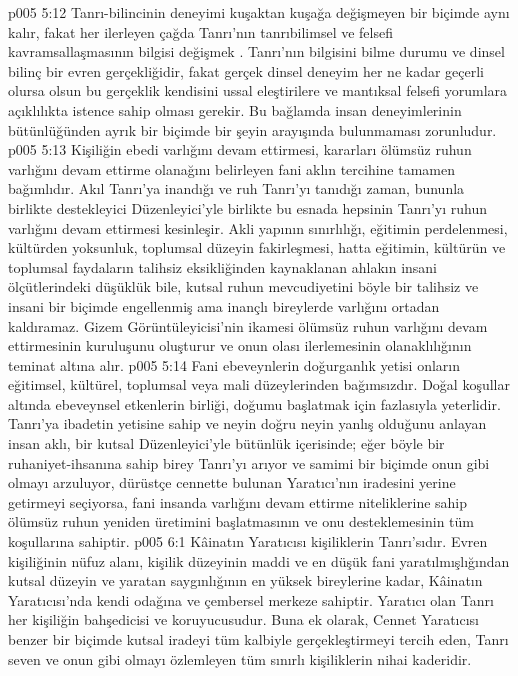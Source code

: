 \vs p005 5:12 Tanrı\hyp{}bilincinin deneyimi kuşaktan kuşağa değişmeyen bir biçimde aynı kalır, fakat her ilerleyen çağda Tanrı’nın tanrıbilimsel ve felsefi kavramsallaşmasının bilgisi değişmek . Tanrı’nın bilgisini bilme durumu ve dinsel bilinç bir evren gerçekliğidir, fakat gerçek dinsel deneyim her ne kadar geçerli olursa olsun bu gerçeklik kendisini ussal eleştirilere ve mantıksal felsefi yorumlara açıklılıkta istence sahip olması gerekir. Bu bağlamda insan deneyimlerinin bütünlüğünden ayrık bir biçimde bir şeyin arayışında bulunmaması zorunludur.
\vs p005 5:13 Kişiliğin ebedi varlığını devam ettirmesi, kararları ölümsüz ruhun varlığını devam ettirme olanağını belirleyen fani aklın tercihine tamamen bağımlıdır. Akıl Tanrı’ya inandığı ve ruh Tanrı’yı tanıdığı zaman, bununla birlikte destekleyici Düzenleyici’yle birlikte bu esnada hepsinin Tanrı’yı  ruhun varlığını devam ettirmesi kesinleşir. Akli yapının sınırlılığı, eğitimin perdelenmesi, kültürden yoksunluk, toplumsal düzeyin fakirleşmesi, hatta eğitimin, kültürün ve toplumsal faydaların talihsiz eksikliğinden kaynaklanan ahlakın insani ölçütlerindeki düşüklük bile, kutsal ruhun mevcudiyetini böyle bir talihsiz ve insani bir biçimde engellenmiş ama inançlı bireylerde varlığını ortadan kaldıramaz. Gizem Görüntüleyicisi’nin ikamesi ölümsüz ruhun varlığını devam ettirmesinin kuruluşunu oluşturur ve onun olası ilerlemesinin olanaklılığının teminat altına alır.
\vs p005 5:14 Fani ebeveynlerin doğurganlık yetisi onların eğitimsel, kültürel, toplumsal veya mali düzeylerinden bağımsızdır. Doğal koşullar altında ebeveynsel etkenlerin birliği, doğumu başlatmak için fazlasıyla yeterlidir. Tanrı’ya ibadetin yetisine sahip ve neyin doğru neyin yanlış olduğunu anlayan insan aklı, bir kutsal Düzenleyici’yle bütünlük içerisinde; eğer böyle bir ruhaniyet\hyp{}ihsanına sahip birey Tanrı’yı arıyor ve samimi bir biçimde onun gibi olmayı arzuluyor, dürüstçe cennette bulunan Yaratıcı’nın iradesini yerine getirmeyi seçiyorsa, fani insanda varlığını devam ettirme niteliklerine sahip ölümsüz ruhun yeniden üretimini başlatmasının ve onu desteklemesinin tüm koşullarına sahiptir.
\vs p005 6:1 Kâinatın Yaratıcısı kişiliklerin Tanrı’sıdır. Evren kişiliğinin nüfuz alanı, kişilik düzeyinin maddi ve en düşük fani yaratılmışlığından kutsal düzeyin ve yaratan saygınlığının en yüksek bireylerine kadar, Kâinatın Yaratıcısı’nda kendi odağına ve çembersel merkeze sahiptir. Yaratıcı olan Tanrı her kişiliğin bahşedicisi ve koruyucusudur. Buna ek olarak, Cennet Yaratıcısı benzer bir biçimde kutsal iradeyi tüm kalbiyle gerçekleştirmeyi tercih eden, Tanrı seven ve onun gibi olmayı özlemleyen tüm sınırlı kişiliklerin nihai kaderidir.
